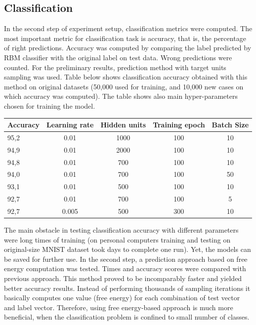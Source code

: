 \documentclass[a4paper]{scrartcl}
\begin{document}
\subsection{Classification}
In the second step of experiment setup, classification metrics were computed. The most important metric for classification task is accuracy, that is, the percentage of right predictions. Accuracy was computed by comparing the label predicted by RBM classifier with the original label on test data. Wrong predictions were counted. For the preliminary results, prediction method with target units sampling was used. Table below shows classification accuracy obtained with this method on original datasets (50,000 used for training, and 10,000 new cases on which accuracy was computed). The table shows also main hyper-parameters chosen for  training the model.
\begin{center}
\hspace{1cm}
\begin{tabular}{|l||c|c|c|c|} \hline
Accuracy & Learning rate & Hidden units & Training epoch & Batch Size
\\ \hline
95,2 & 0.01 & 1000 & 100 & 10
\\ \hline
94,9 & 0.01 & 2000 & 100 & 10
\\ \hline
94,8 & 0.01 & 700 & 100 & 10
\\ \hline
94,0 & 0.01 & 700 & 100 & 50
\\ \hline
93,1 & 0.01 & 500 & 100 & 10
\\ \hline
92,7 & 0.01 & 700 & 100 & 5
\\ \hline
92,7 & 0.005 & 500 & 300 & 10
\\ \hline \end{tabular}
\end{center}
The main obstacle in testing classification accuracy with different parameters were long times of training (on personal computers training and testing on original-size MNIST dataset took days to complete one run). Yet, the models can be saved for further use.
In the second step, a prediction approach based on free energy computation was tested. Times and accuracy scores were compared with previous approach. This method proved to be incomparably faster and yielded better accuracy results. Instead of performing thousands of sampling iterations it basically computes one value (free energy) for each combination of test vector and label vector. Therefore, using free energy-based approach is much more beneficial, when the classification problem is confined to small number of classes. 
\end{document}
